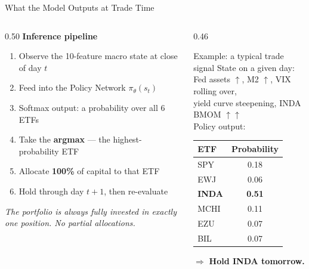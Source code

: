 \documentclass[aspectratio=169,11pt]{beamer}
\begin{document}
\begin{frame}{What the Model Outputs at Trade Time}
  \begin{columns}[T]
    \begin{column}{0.50\textwidth}
      \textbf{Inference pipeline}\\[0.6em]
      \begin{enumerate}\normalsize
        \setlength\itemsep{0.6em}
        \item Observe the 10-feature macro state at close of day $t$
        \item Feed into the Policy Network $\pi_\theta(s_t)$
        \item Softmax output: a probability over all 6 ETFs
        \item Take the \textbf{argmax} --- the highest-probability ETF
        \item Allocate \textbf{100\%} of capital to that ETF
        \item Hold through day $t+1$, then re-evaluate
      \end{enumerate}
      \vspace{0.5em}
      \small\textit{The portfolio is always fully invested in exactly one position. No partial allocations.}
    \end{column}
    \begin{column}{0.46\textwidth}
      \begin{block}{Example: a typical trade signal}
        \vspace{0.3em}\small
        State on a given day:\\[0.2em]
        \quad Fed assets $\uparrow$, M2 $\uparrow$, VIX rolling over,\\
        \quad yield curve steepening, INDA BMOM $\uparrow\uparrow$\\[0.5em]
        Policy output:
        \begin{center}
        \small\begin{tabular}{lc}
          \toprule
          ETF & Probability \\
          \midrule
          SPY  & 0.18 \\
          EWJ  & 0.06 \\
          \rowcolor{blue!10}
          \textbf{INDA} & \textbf{0.51} \\
          MCHI & 0.11 \\
          EZU  & 0.07 \\
          BIL  & 0.07 \\
          \bottomrule
        \end{tabular}
        \end{center}
        $\Rightarrow$ \textbf{Hold INDA tomorrow.}
        \vspace{0.3em}
      \end{block}
    \end{column}
  \end{columns}
\end{frame}
\end{document}
